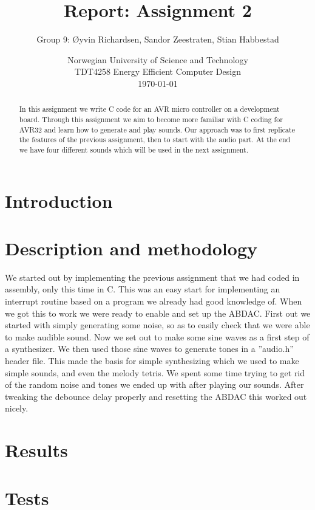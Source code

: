 \documentclass[a4paper,11pt]{article}
\title{\textbf{Report: Assignment 2}}
\author{Group 9: \O yvin Richardsen, Sandor Zeestraten, Stian Habbestad}
\date{{Norwegian University of Science and Technology \\
TDT4258 Energy Efficient Computer Design \\}
\today}
\begin{document}
\maketitle

\begin{abstract}
In this assignment we write C code for an AVR micro controller on a development board. Through this assignment we aim to become more familiar with C coding for AVR32 and learn how to generate and play sounds. Our approach was to first replicate the features of the previous assignment, then to start with the audio part. At the end we have four different sounds which will be used in the next assignment.
\end{abstract}

\tableofcontents
\newpage

\section{Introduction} 



\section{Description and methodology}
We started out by implementing the previous assignment that we had coded in assembly, only this time in C. This was an easy start for implementing an interrupt routine based on a program we already had good knowledge of. When we got this to work we were ready to enable and set up the ABDAC. First out we started with simply generating some noise, so as to easily check that we were able to make audible sound. Now we set out to make some sine waves as a first step of a synthesizer. We then used those sine waves to generate tones in a ''audio.h'' header file. This made the basis for simple synthesizing which we used to make simple sounds, and even the melody tetris. 
We spent some time trying to get rid of the random noise and tones we ended up with after playing our sounds. After tweaking the debounce delay properly and resetting the ABDAC this worked out nicely. 

\section{Results}



\section{Tests}
\end{document}
